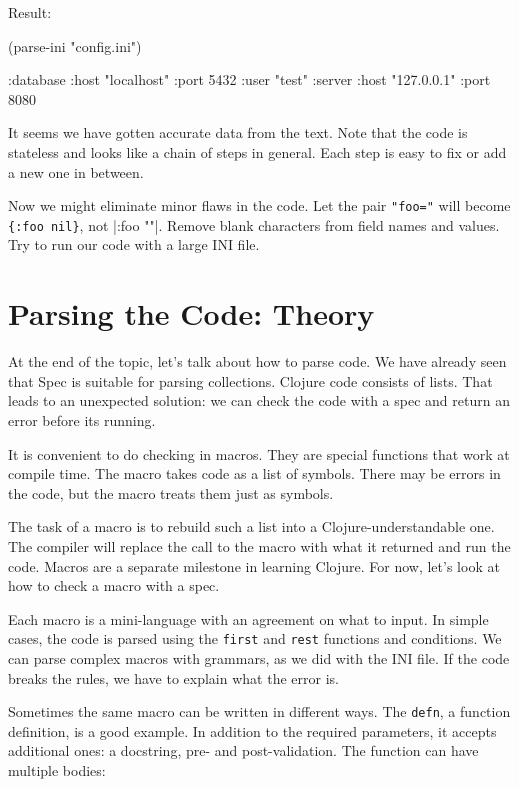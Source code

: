 \noindent
Result:

\begin{english}
  \begin{clojure}
(parse-ini "config.ini")

{:database {:host "localhost"
            :port 5432
            :user "test"}
 :server {:host "127.0.0.1"
          :port 8080}}
  \end{clojure}
\end{english}

It seems we have gotten accurate data from the text. Note that the code is stateless and looks like a chain of steps in general. Each step is easy to fix or add a new one in between.

Now we might eliminate minor flaws in the code. Let the pair \verb|"foo="| will become \verb|{:foo nil}|, not \spverb|{:foo ""}|. Remove blank characters from field names and values. Try to run our code with a large INI file.

\section{Parsing the Code: Theory}


At the end of the topic, let's talk about how to parse code. We have already seen that Spec is suitable for parsing collections. Clojure code consists of lists. That leads to an unexpected solution: we can check the code with a spec and return an error before its running. 

It is convenient to do checking in macros. They are special functions that work at compile time. The macro takes code as a list of symbols. There may be errors in the code, but the macro treats them just as symbols. 

The task of a macro is to rebuild such a list into a Clojure-understandable one. The compiler will replace the call to the macro with what it returned and run the code. Macros are a separate milestone in learning Clojure. For now, let's look at how to check a macro with a spec.

Each macro is a mini-language with an agreement on what to input. In simple cases, the code is parsed using the \verb|first| and \verb|rest| functions and conditions. We can parse complex macros with grammars, as we did with the INI file. If the code breaks the rules, we have to explain what the error is.

Sometimes the same macro can be written in different ways. The \verb|defn|, a function definition, is a good example. In addition to the required parameters, it accepts additional ones: a docstring, pre- and post-validation. The function can have multiple bodies:

